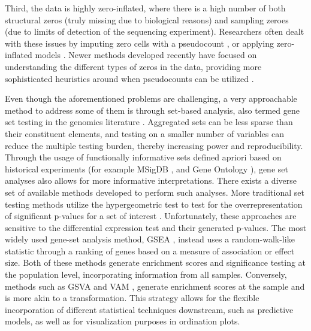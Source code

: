 \documentclass{article}
\begin{document}
Third, the data is highly zero-inflated, where there is a high number of both structural zeros (truly missing due to biological reasons) and sampling zeroes (due to limits of detection of the sequencing experiment). Researchers often dealt with these issues by imputing zero cells with a pseudocount \cite{kurtz2015}, or applying zero-inflated models \cite{chen2018, kaul2017}. Newer methods developed recently have focused on understanding the different types of zeros in the data, providing more sophisticated heuristics around when pseudocounts can be utilized \cite{kaul2017a}.   

Even though the aforementioned problems are challenging, a very approachable method to address some of them is through set-based analysis, also termed gene set testing in the genomics literature \cite{khatri2012, goeman2007}. Aggregated sets can be less sparse than their constituent elements, and testing on a smaller number of variables can reduce the multiple testing burden, thereby increasing power and reproducibility. Through the usage of functionally informative sets defined apriori based on historical experiments (for example MSigDB \cite{subramanian2005}, and Gene Ontology \cite{ashburner2000}), gene set analyses also allows for more informative interpretations. There exists a diverse set of available methods developed to perform such analyses. More traditional set testing methods utilize the hypergeometric test to test for the overrepresentation of significant p-values for a set of interest \cite{goeman2007}. Unfortunately, these approaches are sensitive to the differential expression test and their generated p-values. The most widely used gene-set analysis method, GSEA \cite{subramanian2005}, instead uses a random-walk-like statistic through a ranking of genes based on a measure of association or effect size. Both of these methods generate enrichment scores and significance testing at the population level, incorporating information from all samples. Conversely, methods such as GSVA \cite{hanzelmann2013} and VAM \cite{frost2020a}, generate enrichment scores at the sample and is more akin to a transformation. This strategy allows for the flexible incorporation of different statistical techniques downstream, such as predictive models, as well as for visualization purposes in ordination plots.  
\end{document}
